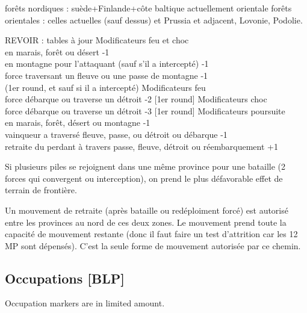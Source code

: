 \bparag  forêts nordiques : suède+Finlande+côte baltique actuellement orientale
\bparag forêts orientales : celles actuelles (sauf dessus) et Prussia et
adjacent, Lovonie, Podolie.


\label{chMilitary:Battle:Forests} REVOIR : tables à jour
\bparag  Modificateurs feu et choc \\
	en marais, forêt ou désert -1 \\
	en montagne pour l'attaquant (sauf s'il a intercepté) -1 \\
	force traversant un fleuve ou une passe de montagne -1 \\
		(1er round, et sauf si il a intercepté)
\bparag Modificateurs feu \\
	force débarque ou traverse un détroit -2 [1er round]
\bparag Modificateurs choc \\
	force débarque ou traverse un détroit -3 [1er round]
\bparag Modificateurs poursuite\\
	en marais, forêt, désert ou montagne -1 \\
	vainqueur a traversé fleuve, passe, ou détroit ou débarque -1 \\
	retraite du perdant à travers passe, fleuve, détroit ou réembarquement +1

\aparag Si plusieurs piles se rejoignent dans une même province pour
une bataille (2 forces qui convergent ou interception), on prend le plus
défavorable effet de terrain de frontière.

 Un mouvement de retraite (après bataille ou
redéploiment forcé) est autorisé entre les provinces au
nord de ces deux zones. Le mouvement prend toute la capacité de mouvement
restante (donc il faut faire un test d'attrition car les 12 MP sont dépensés).
C'est la seule forme de mouvement autorisée par ce chemin.

\subsection{Occupations [BLP]}
\aparag Occupation markers are in limited amount.


